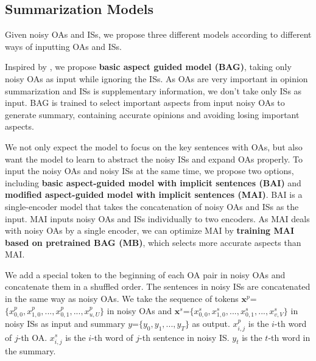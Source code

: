 {\subsection{Summarization Models}
\label{sec:model}

Given noisy OAs and ISs,
we propose three different models according to different ways of inputting OAs and ISs.

Inspired by \cite{OpiDig20}, we propose \textbf{basic aspect guided model (BAG)}, taking only noisy OAs as input while ignoring the ISs.
As OAs are very important in opinion summarization and ISs is supplementary information, we don't take only ISs as input.
BAG is trained to select important aspects from input noisy OAs to generate summary, containing accurate opinions and avoiding 
losing important aspects.

We not only expect the model to focus on the key sentences with OAs, but also want the model to learn to abstract the noisy ISs and expand OAs properly.
To input the noisy OAs and noisy ISs at the same time,
we propose two options, including
\textbf{basic aspect-guided model with implicit sentences (BAI)} and
\textbf{modified aspect-guided model with implicit sentences (MAI)}.
BAI is a single-encoder model that takes the concatenation of noisy OAs and ISs as the input.
MAI inputs noisy OAs and ISs individually to two encoders.
As MAI deals with noisy OAs by a single encoder, 
we can optimize MAI by \textbf{training MAI based on pretrained BAG (MB)},
which selects more accurate aspects than MAI.


We add a special token to the beginning of 
each OA pair in noisy OAs and concatenate them in a shuffled order. 
The sentences in noisy ISs are concatenated in the same way as noisy OAs. 
We take the sequence of tokens  $\textbf{x}^p$=$\{x^p_{0,0},x^p_{1,0},...,x^p_{0,1},...,x^p_{u,U}\}$ in noisy OAs
and $\textbf{x}^s$=$\{x^s_{0,0},x^s_{1,0},...,x^s_{0,1},...,x^s_{v,V}\}$ in noisy ISs
as input and summary $y$=$\{y_0, y_1,..., y_T\}$ as output.
$x^p_{i,j}$ is the $i$-th word of $j$-th OA.
$x^s_{i,j}$ is the $i$-th word of $j$-th sentence in noisy IS.
$y_t$ is the $t$-th word in the summary.
%

}
